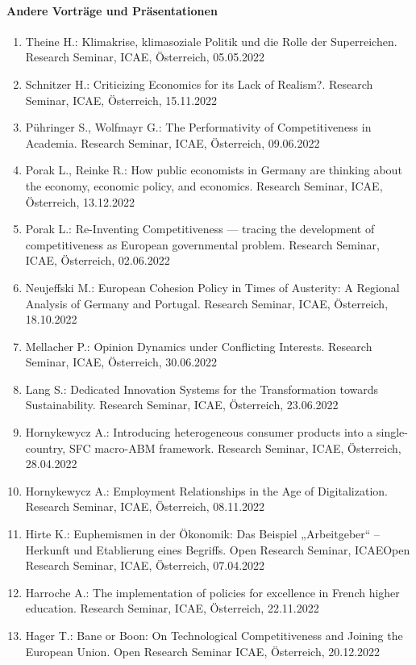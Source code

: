 \paragraph{Andere Vorträge und Präsentationen}
\begin{enumerate}
	\item Theine H.: Klimakrise, klimasoziale Politik und die Rolle der Superreichen. Research Seminar, ICAE, Österreich, 05.05.2022
	\item Schnitzer H.: Criticizing Economics for its Lack of Realism?. Research Seminar, ICAE, Österreich, 15.11.2022
	\item Pühringer S., Wolfmayr G.: The Performativity of Competitiveness in Academia. Research Seminar, ICAE, Österreich, 09.06.2022
	\item Porak L., Reinke R.: How public economists in Germany are thinking about the economy, economic policy, and economics. Research Seminar, ICAE, Österreich, 13.12.2022
	\item Porak L.: Re-Inventing Competitiveness — tracing the development of competitiveness as European governmental problem. Research Seminar, ICAE, Österreich, 02.06.2022
	\item Neujeffski M.: European Cohesion Policy in Times of Austerity: A Regional Analysis of Germany and Portugal. Research Seminar, ICAE, Österreich, 18.10.2022
	\item Mellacher P.: Opinion Dynamics under Conflicting Interests. Research Seminar, ICAE, Österreich, 30.06.2022
	\item Lang S.: Dedicated Innovation Systems for the Transformation towards Sustainability. Research Seminar, ICAE, Österreich, 23.06.2022
	\item Hornykewycz A.: Introducing heterogeneous consumer products into a single-country, SFC macro-ABM framework. Research Seminar, ICAE, Österreich, 28.04.2022
	\item Hornykewycz A.: Employment Relationships in the Age of Digitalization. Research Seminar, ICAE, Österreich, 08.11.2022
	\item Hirte K.: Euphemismen in der Ökonomik: Das Beispiel „Arbeitgeber“ – Herkunft und Etablierung eines Begriffs. Open Research Seminar, ICAEOpen Research Seminar, ICAE, Österreich, 07.04.2022
	\item Harroche A.: The implementation of policies for excellence in French higher education. Research Seminar, ICAE, Österreich, 22.11.2022
	\item Hager T.: Bane or Boon: On Technological Competitiveness and Joining the European Union. Open Research Seminar ICAE, Österreich, 20.12.2022

\end{enumerate}
